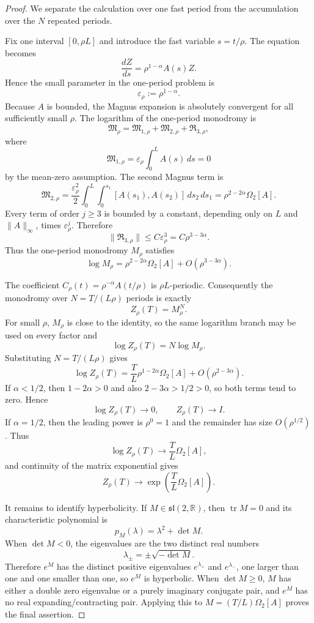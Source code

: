 \documentclass[11pt]{article}
\theoremstyle{definition}\newtheorem{definition}[theorem]{Definition}
\theoremstyle{remark}\newtheorem{remark}[theorem]{Remark}
\newcommand{\R}{\mathbb R}\newcommand{\dd}{\,d}\newcommand{\HH}{\mathcal H}
\begin{document}
\begin{proof}
We separate the calculation over one fast period from the accumulation over the $N$ repeated periods.

Fix one interval $[0,\rho L]$ and introduce the fast variable $s=t/\rho$.  The equation becomes
\[
 \frac{dZ}{ds}
 =\rho^{1-\alpha}A(s)Z.
\]
Hence the small parameter in the one-period problem is
\[
 \varepsilon_\rho:=\rho^{1-\alpha}.
\]
Because $A$ is bounded, the Magnus expansion is absolutely convergent for all sufficiently small $\rho$.  The logarithm of the one-period monodromy is
\[
 \mathfrak M_\rho
 =\mathfrak M_{1,\rho}+\mathfrak M_{2,\rho}+\mathfrak R_{3,\rho},
\]
where
\[
 \mathfrak M_{1,\rho}
 =\varepsilon_\rho\int_0^L A(s)\,ds=0
\]
by the mean-zero assumption.  The second Magnus term is
\[
 \mathfrak M_{2,\rho}
 =\frac{\varepsilon_\rho^2}{2}
   \int_0^L\int_0^{s_1}[A(s_1),A(s_2)]\,ds_2\,ds_1
 =\rho^{2-2\alpha}\Omega_2[A].
\]
Every term of order $j\ge3$ is bounded by a constant, depending only on $L$ and $\|A\|_\infty$, times $\varepsilon_\rho^j$.  Therefore
\[
 \|\mathfrak R_{3,\rho}\|
 \le C\varepsilon_\rho^3
 =C\rho^{3-3\alpha}.
\]
Thus the one-period monodromy $M_\rho$ satisfies
\[
 \log M_\rho
 =\rho^{2-2\alpha}\Omega_2[A]
   +O(\rho^{3-3\alpha}).
\]

The coefficient $C_\rho(t)=\rho^{-\alpha}A(t/\rho)$ is $\rho L$-periodic.  Consequently the monodromy over $N=T/(L\rho)$ periods is exactly
\[
 Z_\rho(T)=M_\rho^N.
\]
For small $\rho$, $M_\rho$ is close to the identity, so the same logarithm branch may be used on every factor and
\[
 \log Z_\rho(T)
 =N\log M_\rho.
\]
Substituting $N=T/(L\rho)$ gives
\[
 \log Z_\rho(T)
 =\frac TL\rho^{1-2\alpha}\Omega_2[A]
   +O(\rho^{2-3\alpha}).
\]
If $\alpha<1/2$, then $1-2\alpha>0$ and also $2-3\alpha>1/2>0$, so both terms tend to zero.  Hence
\[
 \log Z_\rho(T)\to0,
 \qquad
 Z_\rho(T)\to I.
\]
If $\alpha=1/2$, then the leading power is $\rho^0=1$ and the remainder has size $O(\rho^{1/2})$.  Thus
\[
 \log Z_\rho(T)
 \longrightarrow \frac TL\Omega_2[A],
\]
and continuity of the matrix exponential gives
\[
 Z_\rho(T)
 \longrightarrow
 \exp\!\left(\frac TL\Omega_2[A]\right).
\]

It remains to identify hyperbolicity.  If $M\in\mathfrak{sl}(2,\R)$, then $\operatorname{tr}M=0$ and its characteristic polynomial is
\[
 p_M(\lambda)=\lambda^2+\det M.
\]
When $\det M<0$, the eigenvalues are the two distinct real numbers
\[
 \lambda_\pm=\pm\sqrt{-\det M}.
\]
Therefore $e^M$ has the distinct positive eigenvalues $e^{\lambda_+}$ and $e^{\lambda_-}$, one larger than one and one smaller than one, so $e^M$ is hyperbolic.  When $\det M\ge0$, $M$ has either a double zero eigenvalue or a purely imaginary conjugate pair, and $e^M$ has no real expanding/contracting pair.  Applying this to $M=(T/L)\Omega_2[A]$ proves the final assertion.
\end{proof}
\end{document}
